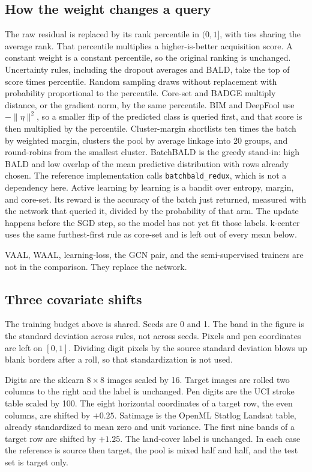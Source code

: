 \documentclass[11pt]{article}
\begin{document}
\subsection*{How the weight changes a query}

The raw residual is replaced by its rank percentile in $(0,1]$, with ties sharing the average rank. That percentile multiplies a higher-is-better acquisition score. A constant weight is a constant percentile, so the original ranking is unchanged. Uncertainty rules, including the dropout averages and BALD, take the top of score times percentile. Random sampling draws without replacement with probability proportional to the percentile. Core-set and BADGE multiply distance, or the gradient norm, by the same percentile. BIM and DeepFool use $-\lVert\eta\rVert^2$, so a smaller flip of the predicted class is queried first, and that score is then multiplied by the percentile. Cluster-margin shortlists ten times the batch by weighted margin, clusters the pool by average linkage into 20 groups, and round-robins from the smallest cluster. BatchBALD is the greedy stand-in: high BALD and low overlap of the mean predictive distribution with rows already chosen. The reference implementation calls \texttt{batchbald\_redux}, which is not a dependency here. Active learning by learning is a bandit over entropy, margin, and core-set. Its reward is the accuracy of the batch just returned, measured with the network that queried it, divided by the probability of that arm. The update happens before the SGD step, so the model has not yet fit those labels. k-center uses the same furthest-first rule as core-set and is left out of every mean below.

VAAL, WAAL, learning-loss, the GCN pair, and the semi-supervised trainers are not in the comparison. They replace the network.

\subsection*{Three covariate shifts}

The training budget above is shared. Seeds are 0 and 1. The band in the figure is the standard deviation across rules, not across seeds. Pixels and pen coordinates are left on $[0,1]$. Dividing digit pixels by the source standard deviation blows up blank borders after a roll, so that standardization is not used.

Digits are the sklearn $8\times 8$ images scaled by 16. Target images are rolled two columns to the right and the label is unchanged. Pen digits are the UCI stroke table scaled by 100. The eight horizontal coordinates of a target row, the even columns, are shifted by $+0.25$. Satimage is the OpenML Statlog Landsat table, already standardized to mean zero and unit variance. The first nine bands of a target row are shifted by $+1.25$. The land-cover label is unchanged. In each case the reference is source then target, the pool is mixed half and half, and the test set is target only.
\end{document}

